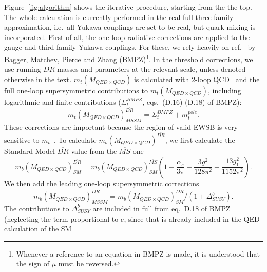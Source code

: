 \documentclass{article}
\begin{document}
Figure~\ref{fig:algorithm} shows the iterative procedure, starting from the the
top. The whole calculation is currently performed in the real full three family
approximation, i.e.\ all Yukawa couplings are set to be real, but quark mixing
is incorporated.
First of all, the one-loop radiative corrections are applied to the gauge
and third-family Yukawa couplings. For these, we rely heavily on
ref.~\cite{Pierce:1997zz}
by Bagger, Matchev, Pierce and Zhang (BMPZ)\footnote{Whenever a reference to
an equation in BMPZ is made, it is understood that the sign of $\mu$ must be
reversed.}.
In the threshold corrections, we use running $\overline{DR}$
masses and parameters at the relevant scale, unless denoted otherwise in the
text. 
$m_t(M_{QED \times QCD})$ is calculated with 2-loop QCD~\cite{avdeev} and
the full one-loop supersymmetric
contributions to $m_t(M_{QED \times QCD})$, including logarithmic and finite contributions
($\Sigma_t^{BMPZ}$, eqs.~(D.16)-(D.18) of BMPZ):
\begin{equation}
m_t(M_{QED \times QCD})^{\overline{DR}}_{MSSM} = \Sigma_t^{BMPZ} + m_t^{pole}. 
\end{equation}
These corrections are important because the region of valid EWSB is very
sensitive to $m_t$~\cite{Allanach:2000ii}. 
To calculate $m_b(M_{QED \times QCD})^{\overline{DR}}$, we first calculate the Standard Model
$\overline{DR}$ value from the $\overline{MS}$ one~\cite{avdeev,bottomMass}
\begin{equation}
m_b(M_{QED \times QCD})^{\overline{DR}}_{SM} =
m_b(M_{QED \times QCD})^{\overline{MS}}_{SM} \left(1 - \frac{{\alpha_s}}{3 \pi}+ 
\frac{3 g^2}{128 \pi^2} + \frac{13 g_1^2}{1152 \pi^2} \right).
\end{equation}
We then add the leading one-loop supersymmetric corrections
\begin{equation}
m_b(M_{QED \times QCD})^{\overline{DR}}_{MSSM}=m_b(M_{QED \times QCD})^{\overline{DR}}_{SM} / (1 +
  \Delta_{SUSY}^b).
\end{equation}
The contributions to $\Delta_{SUSY}^b$ are
included in full from eq.~D.18 of BMPZ (neglecting the term proportional to
$e$, since that is already included in the QED calculation of the SM 
\end{document}
